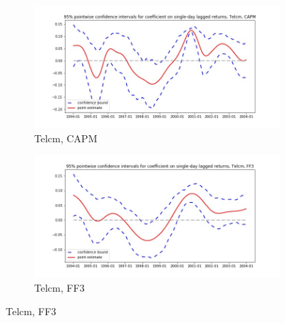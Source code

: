 \documentclass{article}
\begin{document}
   \begin{figure}
  \begin{subfigure}[b]{0.5\textwidth}
    \centering
    \includegraphics[width=\textwidth]{Telcm/pointwiseCIs_CAPM.jpg}
    \caption{Telcm, CAPM}
    \label{fig:1}
  \end{subfigure}
  \begin{subfigure}[b]{0.5\textwidth}
    \centering
    \includegraphics[width=\textwidth]{Telcm/pointwiseCIs_FF3.jpg}
    \caption{Telcm, FF3}
    \label{fig:2}
  \end{subfigure}
  \end{figure}
  
  
\end{document}
